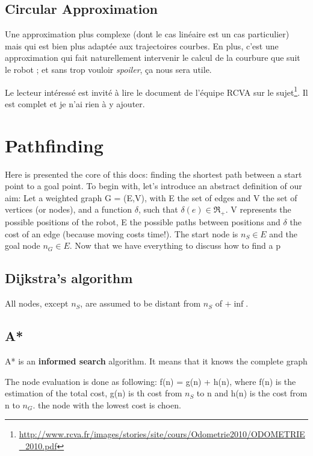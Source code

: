\documentclass[11pt]{article}
\begin{document}
    \subsection{Circular Approximation}\label{subsec:circularApproximation}

    Une approximation plus complexe (dont le cas linéaire est un cas particulier) mais qui est bien plus adaptée aux trajectoires courbes. En plus, c'est une approximation qui fait naturellement intervenir le calcul de la courbure que suit le robot ; et sans trop vouloir \textit{spoiler}, ça nous sera utile.

    Le lecteur intéressé est invité à lire le document de l'équipe RCVA sur le sujet\cite{odorcva}\footnote{\url{http://www.rcva.fr/images/stories/site/cours/Odometrie2010/ODOMETRIE\_2010.pdf}}. Il est complet et je n'ai rien à y ajouter.



    \section{Pathfinding}\label{sec:pathfinding}
	Here is presented the core of this docs: finding the shortest path between a start point to a goal point. To begin with, let's introduce an abstract definition of our aim: Let a weighted graph G = (E,V), with E the set of edges and V the set of vertices (or nodes), and a function $\delta$, such that $\delta(e) \in \Re_{+}$. V represents the possible positions of the robot, E the possible paths between positions and $\delta$ the cost of an edge (because moving costs time!). 
	The start node is $n_S \in E$ and the goal node $n_G \in E$.
	Now that we have everything to discuss how to find a p
	
	\subsection{Dijkstra's algorithm}
	All nodes, except $n_S$, are assumed to be distant from $n_S$ of $+\inf$. 
		
    \subsection{A*}\label{subsec:a*}
    A* is an \textbf{informed search} algorithm. It means that it knows the complete graph

	The node evaluation is done as following: f(n) = g(n) + h(n), where f(n) is the estimation of the total cost, g(n) is th cost from $n_S$ to n and h(n) is the cost from n to $n_G$. the node with the lowest cost is choen.
	
\end{document}
